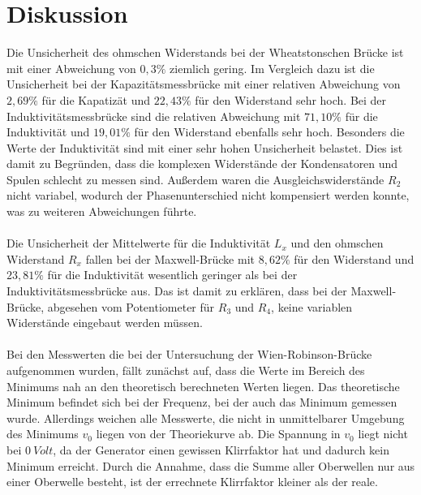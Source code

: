 \section{Diskussion}
\label{sec:Diskussion}
Die Unsicherheit des ohmschen Widerstands bei der Wheatstonschen Brücke ist mit einer Abweichung von $0,3\%$ ziemlich gering.
Im Vergleich dazu ist die Unsicherheit bei der Kapazitätsmessbrücke mit einer relativen Abweichung von $2,69\%$ für die Kapatizät und $22,43\%$ für den Widerstand sehr hoch.
Bei der Induktivitätsmessbrücke sind die relativen Abweichung mit $71,10\%$ für die Induktivität und $19,01\%$ für den Widerstand ebenfalls sehr hoch.
Besonders die Werte der Induktivität sind mit einer sehr hohen Unsicherheit belastet.
Dies ist damit zu Begründen, dass die komplexen Widerstände der Kondensatoren und Spulen schlecht zu messen sind.
Außerdem waren die Ausgleichswiderstände $R_2$ nicht variabel, wodurch der Phasenunterschied nicht kompensiert werden konnte, was zu weiteren Abweichungen führte.
\\\\
Die Unsicherheit der Mittelwerte für die Induktivität $L_x$ und den ohmschen Widerstand $R_x$ fallen bei der Maxwell-Brücke mit $8,62\%$ für den Widerstand und $23,81\%$ für die Induktivität wesentlich geringer als bei der Induktivitätsmessbrücke aus.
Das ist damit zu erklären, dass bei der Maxwell-Brücke, abgesehen vom Potentiometer für $R_3$ und $R_4$, keine variablen Widerstände eingebaut werden müssen.
\\\\
Bei den Messwerten die bei der Untersuchung der Wien-Robinson-Brücke aufgenommen wurden, fällt zunächst auf, dass die Werte im Bereich des Minimums nah an den theoretisch berechneten Werten liegen.
Das theoretische Minimum befindet sich bei der Frequenz, bei der auch das Minimum gemessen wurde.
Allerdings weichen alle Messwerte, die nicht in unmittelbarer Umgebung des Minimums $v_0$ liegen von der Theoriekurve ab.
Die Spannung in $v_0$ liegt nicht bei $\SI{0}{Volt}$, da der Generator einen gewissen Klirrfaktor hat und dadurch kein Minimum erreicht.
Durch die Annahme, dass die Summe aller Oberwellen nur aus einer Oberwelle besteht, ist der errechnete Klirrfaktor kleiner als der reale.